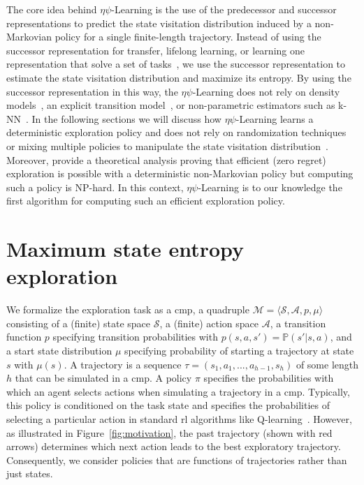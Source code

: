 \documentclass{article}
\theoremstyle{plain}
\theoremstyle{definition}
\theoremstyle{remark}
\newcommand{\alg}{$\eta$$\psi$-Learning}
\begin{document}
The core idea behind \alg{} is the use of the predecessor and successor representations to predict the state visitation distribution induced by a non-Markovian policy for a single finite-length trajectory.
Instead of using the successor representation for transfer, lifelong learning, or learning one representation that solve a set of tasks~\citep{barreto2017successor,zhang2017deep,barreto2018transfer,borsa2018universal,ma2018universal,siriwardhana2019vusfa,hansen2019fast,barreto2020fast,lehnert2020successor,lehnert2020reward,abdolshah2021new,touati2021learning}, we use the successor representation to estimate the state visitation distribution and maximize its entropy.
By using the successor representation in this way, the \alg{} does not rely on density models~\cite{pmlr-v97-hazan19a,lee2019efficient}, an explicit transition model~\cite{tarbouriech2019active, mutti2020intrinsically}, or non-parametric estimators such as k-NN~\cite{mutti2021task}.
In the following sections we will discuss how \alg{} learns a deterministic exploration policy and does not rely on randomization techniques~\citep{mutti2021task,lee2019efficient} or mixing multiple policies to manipulate the state visitation distribution~\cite{lee2019efficient,pmlr-v97-hazan19a}.
Moreover, \citet{mutti2022unsupervised} provide a theoretical analysis proving that efficient (zero regret) exploration is possible with a deterministic non-Markovian policy but computing such a policy is NP-hard.
In this context, \alg{} is to our knowledge the first algorithm for computing such an efficient exploration policy.


\section{Maximum state entropy exploration}
\label{sec:background}

We formalize the exploration task as a \gls{cmp}, a quadruple $\mathcal{M}= \langle \mathcal{S}, \mathcal{A}, p, \mu \rangle$ consisting of a (finite) state space $\mathcal{S}$, a (finite) action space $\mathcal{A}$, a transition function $p$ specifying transition probabilities with $p(s,a,s') = \mathbb{P}( s' | s,a )$, and a start state distribution $\mu$ specifying probability of starting a trajectory at state $s$ with $\mu(s)$.
A trajectory is a sequence $\tau = (s_1,a_1,...,a_{h-1},s_h)$ of some length $h$ that can be simulated in a \gls{cmp}.
A policy $\pi$ specifies the probabilities with which an agent selects actions when simulating a trajectory in a \gls{cmp}.
Typically, this policy is conditioned on the task state and specifies the probabilities of selecting a particular action in standard \gls{rl} algorithms like Q-learning~\cite{watkins1992qlearning,sutton2018reinforcement}. 
However, as illustrated in Figure~\ref{fig:motivation}, the past trajectory (shown with red arrows) determines which next action leads to the best exploratory trajectory.
Consequently, we consider policies that are functions of trajectories rather than just states.
\end{document}
